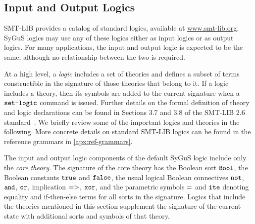 \documentclass[english,a4paper,10pt]{article}
\begin{document}
\subsection{Input and Output Logics}
\label{ssec:smt-logic}

SMT-LIB provides a catalog of standard logics,
available at \url{www.smt-lib.org}.
SyGuS logics may use any of these logics
either as input logics or as output logics.
For many applications,
the input and output logic is expected to be the same, although
no relationship between the two is required.

At a high level, a \emph{logic} includes a set of theories
and defines a subset of terms constructible in the signature of those theories
that belong to it.
If a logic includes a theory, then its symbols are added
to the current signature when a $\texttt{set-logic}$ command is issued.
Further details on the formal definition of 
theory and logic declarations can be found in Sections 3.7 and 3.8
of the SMT-LIB 2.6 standard~\cite{BarFT-RR-17}.
We briefly review some of the important logics and theories in the following.
More concrete details on
standard SMT-LIB logics can be found in the reference
grammars in \cref{apx:ref-grammars}.

The input and output logic components of the default SyGuS logic include only the
\emph{core theory}.
The signature of the core theory 
has the Boolean sort ${\tt Bool}$,
the Boolean constants ${\tt true}$ and ${\tt false}$, the
usual logical Boolean connectives 
${\tt not}$, ${\tt and}$, ${\tt or}$, implication ${\tt =>}$, ${\tt xor}$,
and the parametric symbols ${\tt =}$ and ${\tt ite}$
denoting equality and if-then-else terms for all sorts in the signature.
Logics that include the theories mentioned in this section supplement the signature
of the current state with additional sorts and symbols of that theory.
\end{document}
